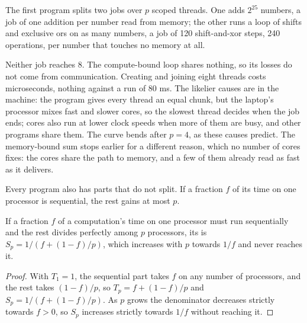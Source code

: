The first program splits two jobs over $p$ scoped threads. One adds $2^{25}$ numbers, a job of one addition per number read from memory; the other runs a loop of shifts and exclusive ors on as many numbers, a job of 120 shift-and-xor steps, 240 operations, per number that touches no memory at all.

\label{lst:b3:parallel-programming:sum}

\label{out:b3:parallel-programming:sum}

Neither job reaches 8. The compute-bound loop shares nothing, so its losses do not come from communication. Creating and joining eight threads costs microseconds, nothing against a run of 80 ms. The likelier causes are in the machine: the program gives every thread an equal chunk, but the laptop's processor mixes fast and slower cores, so the slowest thread decides when the job ends; cores also run at lower clock speeds when more of them are busy, and other programs share them. The curve bends after $p = 4$, as these causes predict. The memory-bound sum stops earlier for a different reason, which no number of cores fixes: the cores share the path to memory, and a few of them already read as fast as it delivers.

Every program also has parts that do not split. If a fraction $f$ of its time on one processor is sequential, the rest gains at most $p$.

\begin{theorem}\label{thm:b3:parallel-programming:amdahl}
If a fraction $f$ of a computation's time on one processor must run sequentially and the rest divides perfectly among $p$ processors, its  is $S_p = 1 / (f + (1 - f)/p)$, which increases with $p$ towards $1/f$ and never reaches it.
\end{theorem}

\begin{proof}
With $T_1 = 1$, the sequential part takes $f$ on any number of processors, and the rest takes $(1 - f)/p$, so $T_p = f + (1 - f)/p$ and $S_p = 1 / (f + (1 - f)/p)$. As $p$ grows the denominator decreases strictly towards $f > 0$, so $S_p$ increases strictly towards $1/f$ without reaching it.
\end{proof}

